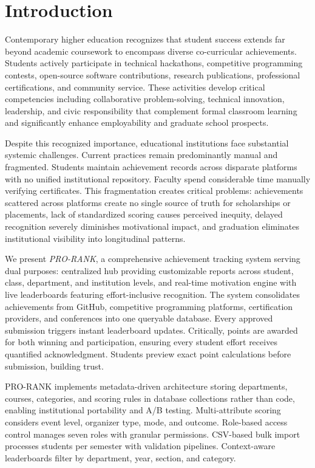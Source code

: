 \documentclass[12pt]{article}
\begin{document}
\section{Introduction}

Contemporary higher education recognizes that student success extends far beyond academic coursework to encompass diverse co-curricular achievements. Students actively participate in technical hackathons, competitive programming contests, open-source software contributions, research publications, professional certifications, and community service. These activities develop critical competencies including collaborative problem-solving, technical innovation, leadership, and civic responsibility that complement formal classroom learning and significantly enhance employability and graduate school prospects.

Despite this recognized importance, educational institutions face substantial systemic challenges. Current practices remain predominantly manual and fragmented. Students maintain achievement records across disparate platforms with no unified institutional repository. Faculty spend considerable time manually verifying certificates. This fragmentation creates critical problems: achievements scattered across platforms create no single source of truth for scholarships or placements, lack of standardized scoring causes perceived inequity, delayed recognition severely diminishes motivational impact, and graduation eliminates institutional visibility into longitudinal patterns.

We present \textit{PRO-RANK}, a comprehensive achievement tracking system serving dual purposes: centralized hub providing customizable reports across student, class, department, and institution levels, and real-time motivation engine with live leaderboards featuring effort-inclusive recognition. The system consolidates achievements from GitHub, competitive programming platforms, certification providers, and conferences into one queryable database. Every approved submission triggers instant leaderboard updates. Critically, points are awarded for both winning and participation, ensuring every student effort receives quantified acknowledgment. Students preview exact point calculations before submission, building trust.

PRO-RANK implements metadata-driven architecture storing departments, courses, categories, and scoring rules in database collections rather than code, enabling institutional portability and A/B testing. Multi-attribute scoring considers event level, organizer type, mode, and outcome. Role-based access control manages seven roles with granular permissions. CSV-based bulk import processes students per semester with validation pipelines. Context-aware leaderboards filter by department, year, section, and category.
\end{document}
